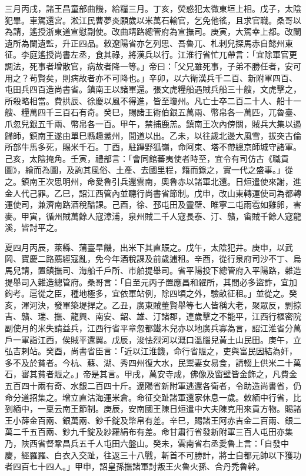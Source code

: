 \begin{pinyinscope}
 三月丙戌，諸王昌童部曲饑，給糧三月。丁亥，熒惑犯太微東垣上相。戊子，太陰犯畢。車駕還宮。淞江民曹夢炎願歲以米萬石輸官，乞免他徭，且求官職。桑哥以為請，遙授浙東道宣慰副使。改曲靖路總管府為宣撫司。庚寅，大駕幸上都。改闌遺所為闌遺監，升正四品。敕遼陽省亦乞列思、吾魯兀、札剌兒探馬赤自懿州東征。李庭遙授尚書左丞，食其祿，將漢兵以行。江淮行省忙兀帶言：「宜除軍官更調法，死事者增散官，病故者降一等。」帝曰：「父兄雖死事，子弟不勝任者，安可用之？茍賢矣，則病故者亦不可降也。」辛卯，以六衛漢兵千二百、新附軍四百、屯田兵四百造尚書省。鎮南王以諸軍還。張文虎糧船遇賊兵船三十艘，文虎擊之，所殺略相當。費拱辰、徐慶以風不得進，皆至瓊州。凡亡士卒二百二十人、船十一艘、糧萬四千三百石有奇。癸巳，賜諸王術伯銀五萬兩、幣帛各一萬匹，兀魯臺、爪忽兒銀五千兩、幣帛各一百。甲午，禁捕鹿羔。鎮南王次內傍關，賊兵大集以遏歸師，鎮南王遂由單巳縣趣盝州，間道以出。乙未，以往歲北邊大風雪，拔突古倫所部牛馬多死，賜米千石。丁酉，駐蹕野狐嶺，命阿束、塔不帶總京師城守諸軍。己亥，太陰掩角。壬寅，禮部言：「會同館蕃夷使者時至，宜令有司仿古《職貢圖》，繪而為圖，及詢其風俗、土產、去國里程，籍而錄之，實一代之盛事。」從之。鎮南王次思明州，命愛魯引兵還雲南，奧魯赤以諸軍北還。日烜遣使來謝，進金人代己罪。乙巳，詔江西管內並聽行尚書省節制。戊申，改山東轉運使司為都轉運使司，兼濟南路酒稅醋課。己酉，徐、邳屯田及靈壁、睢寧二屯雨雹如雞卵，害麥。甲寅，循州賊萬餘人寇漳浦，泉州賊二千人寇長泰、汀、贛，畬賊千餘人寇龍溪，皆討平之。



 夏四月丙辰，萊縣、蒲臺旱饑，出米下其直賑之。戊午，太陰犯井。庚申，以武岡、寶慶二路薦經寇亂，免今年酒稅課及前歲逋租。辛酉，從行泉府司沙不丁、烏馬兒請，置鎮撫司、海船千戶所、市舶提舉司。省平陽投下總管府入平陽路，雜造提舉司入雜造總管府。桑哥言：「自至元丙子置應昌和糴所，其間必多盜詐，宜加鉤考。扈從之臣，種地極多，宜依軍站例，除四頃之外，驗畝征租。」並從之。癸亥，渾河決，發軍築堤捍之。乙丑，廣東賊董賢舉等七人皆稱大老，聚眾反，剽掠吉、贛、瑞、撫、龍興、南安、韶、雄、汀諸郡，連歲擊之不能平，江西行樞密院副使月的米失請益兵，江西行省平章忽都鐵木兒亦以地廣兵寡為言，詔江淮省分萬戶一軍詣江西，俟賊平還翼。戊辰，浚怯烈河以溉口溫腦兒黃土山民田。庚午，立弘吉剌站。癸酉，尚書省臣言：「近以江淮饑，命行省賑之，吏與富民因結為奸，多不及於貧者。今杭、蘇、湖、秀四州復大水，民鬻妻女易食，請輟上供米二十萬石，審其貧者賑之。」帝是其言。甲戌，萬安寺成，佛像及窗壁皆金飾之，凡費金五百四十兩有奇、水銀二百四十斤。遼陽省新附軍逃還各衛者，令助造尚書省，仍命分道招集之。增立直沽海運米倉。命征交趾諸軍還家休息一歲。敕緬中行省，比到緬中，一稟云南王節制。庚辰，安南國王陳日烜遣中大夫陳克用來貢方物。賜諸王小薛金百兩、銀萬兩、鈔千錠及幣帛有差。辛巳，賜諸王阿赤吉金二百兩、銀二萬二千五百兩、鈔九千錠及紗羅絹布有差。命甘肅行省發新附軍三百人屯田亦集乃，陜西省督鞏昌兵五千人屯田六盤山。癸未，雲南省右丞愛魯上言：「自發中慶，經羅羅、白衣入交趾，往返三十八戰，斬首不可勝計，將士自都元帥以下獲功者四百七十四人。」甲申，詔皇孫撫諸軍討叛王火魯火孫、合丹禿魯幹。




\end{pinyinscope}
